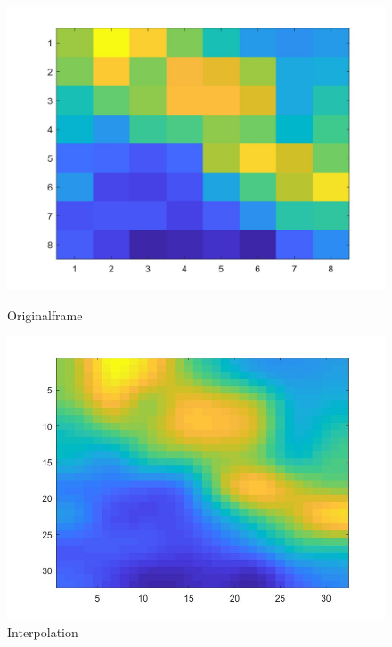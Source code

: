 \begin{figure}[!ht]
	\centering
	\begin{minipage}[c]{0.3\linewidth}
	\centering
	\includegraphics[width=1.0\linewidth]{fig/interpol_1}
	\caption[Originalframe]{Originalframe}
	\label{fig:interpol2}
	\end{minipage}
	\begin{minipage}[c]{0.3\linewidth}
		\centering
	\includegraphics[width=1.0\linewidth]{fig/interpol_2}
	\caption[bikubische interpoliert]{Interpolation}
	\label{fig:interpol2}
	\end{minipage}
	\begin{minipage}[c]{0.3\linewidth  }
			\centering

\end{minipage}
\end{figure}
